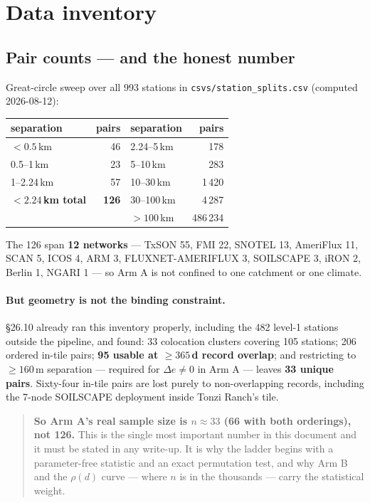 \documentclass[11pt,a4paper]{article}
\begin{document}
\section{Data inventory}
\label{sec:inventory}

\subsection{Pair counts --- and the honest number}

Great-circle sweep over all 993 stations in \verb|csvs/station_splits.csv|
(computed 2026-08-12):

\begin{table}[h]
\centering\small
\begin{tabular}{@{}lr@{\qquad}lr@{}}
\toprule
separation & pairs & separation & pairs \\
\midrule
$<0.5$\,km      & 46  & 2.24--5\,km   & 178 \\
0.5--1\,km      & 23  & 5--10\,km     & 283 \\
1--2.24\,km     & 57  & 10--30\,km    & 1\,420 \\
\textbf{$<2.24$\,km total} & \textbf{126} & 30--100\,km & 4\,287 \\
                &     & $>100$\,km    & 486\,234 \\
\bottomrule
\end{tabular}
\end{table}

The 126 span \textbf{12 networks} --- TxSON 55, FMI 22, SNOTEL 13, AmeriFlux 11, SCAN 5,
ICOS 4, ARM 3, FLUXNET-AMERIFLUX 3, SOILSCAPE 3, iRON 2, Berlin 1, NGARI 1 --- so Arm A is
not confined to one catchment or one climate.

\paragraph{But geometry is not the binding constraint.} \S26.10 already ran this inventory
properly, including the 482 level-1 stations outside the pipeline, and found:
33 colocation clusters covering 105 stations; 206 ordered in-tile pairs; \textbf{95 usable
at $\ge 365$\,d record overlap}; and restricting to $\ge 160$\,m separation --- required
for $\Delta e \ne 0$ in Arm A --- leaves \textbf{33 unique pairs}. Sixty-four in-tile pairs
are lost purely to non-overlapping records, including the 7-node SOILSCAPE deployment
inside Tonzi Ranch's tile.

\begin{quote}
\textbf{So Arm A's real sample size is $n \approx 33$ (66 with both orderings), not 126.}
This is the single most important number in this document and it must be stated in any
write-up. It is why the ladder begins with a parameter-free statistic and an exact
permutation test, and why Arm B and the $\rho(d)$ curve --- where $n$ is in the thousands
--- carry the statistical weight.
\end{quote}
\end{document}
